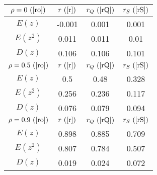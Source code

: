 \begin{tabular}{|c|c|c|c|}
\hline
$\rho = 0~(\ref{ro})$ & $r ~(\ref{r})$ & $r_Q ~(\ref{rQ})$ & $r_S ~(\ref{rS})$\\
\hline
$E(z)$ & -0.001 & 0.001 & 0.001\\
\hline
$E(z^2)$ & 0.011 & 0.011 & 0.01\\
\hline
$D(z)$ & 0.106 & 0.106 & 0.101\\
\hline
$\rho = 0.5~(\ref{ro})$ & $r ~(\ref{r})$ & $r_Q ~(\ref{rQ})$ & $r_S ~(\ref{rS})$\\
\hline
$E(z)$ & 0.5 & 0.48 & 0.328\\
\hline
$E(z^2)$ & 0.256 & 0.236 & 0.117\\
\hline
$D(z)$ & 0.076 & 0.079 & 0.094\\
\hline
$\rho = 0.9~(\ref{ro})$ & $r ~(\ref{r})$ & $r_Q ~(\ref{rQ})$ & $r_S ~(\ref{rS})$\\
\hline
$E(z)$ & 0.898 & 0.885 & 0.709\\
\hline
$E(z^2)$ & 0.807 & 0.784 & 0.507\\
\hline
$D(z)$ & 0.019 & 0.024 & 0.072\\
\hline
\end{tabular}